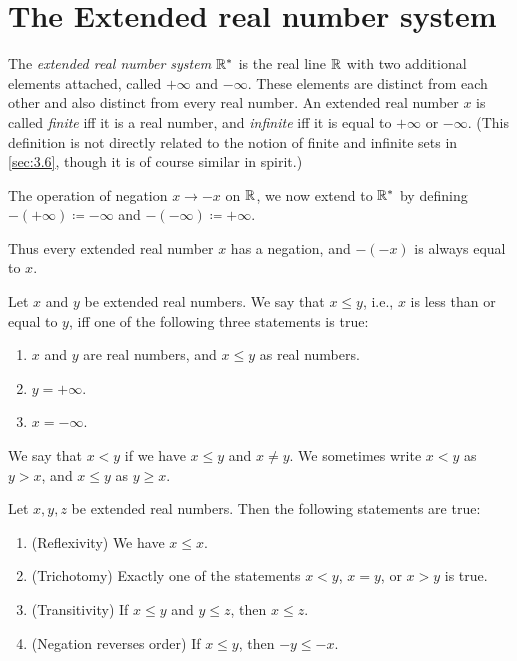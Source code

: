 \section{The Extended real number system}\label{sec:6.2}

\begin{defn}\label{6.2.1}
  The \emph{extended real number system \(\mathbb{R}^*\)} is the real line \(\mathbb{R}\) with two additional elements attached, called \(+\infty\) and \(-\infty\).
  These elements are distinct from each other and also distinct from every real number.
  An extended real number \(x\) is called \emph{finite} iff it is a real number, and \emph{infinite} iff it is equal to \(+\infty\) or \(-\infty\).
  (This definition is not directly related to the notion of finite and infinite sets in \cref{sec:3.6}, though it is of course similar in spirit.)
\end{defn}

\begin{defn}\label{6.2.2}
  The operation of negation \(x \to -x\) on \(\mathbb{R}\), we now extend to \(\mathbb{R}^*\) by defining \(-(+\infty) \coloneqq -\infty\) and \(-(-\infty) \coloneqq +\infty\).
\end{defn}

\begin{note}
  Thus every extended real number \(x\) has a negation, and \(-(-x)\) is always equal to \(x\).
\end{note}

\begin{defn}\label{6.2.3}
  Let \(x\) and \(y\) be extended real numbers.
  We say that \(x \leq y\), i.e., \(x\) is less than or equal to \(y\), iff one of the following three statements is true:
  \begin{enumerate}
    \item \(x\) and \(y\) are real numbers, and \(x \leq y\) as real numbers.
    \item \(y = +\infty\).
    \item \(x = -\infty\).
  \end{enumerate}
  We say that \(x < y\) if we have \(x \leq y\) and \(x \neq y\).
  We sometimes write \(x < y\) as \(y > x\), and \(x \leq y\) as \(y \geq x\).
\end{defn}

\setcounter{thm}{4}
\begin{prop}\label{6.2.5}
  Let \(x, y, z\) be extended real numbers.
  Then the following statements are true:
  \begin{enumerate}
    \item (Reflexivity)
          We have \(x \leq x\).
    \item (Trichotomy)
          Exactly one of the statements \(x < y\), \(x = y\), or \(x > y\) is true.
    \item (Transitivity)
          If \(x \leq y\) and \(y \leq z\), then \(x \leq z\).
    \item (Negation reverses order) If \(x \leq y\), then \(-y \leq -x\).
  \end{enumerate}
\end{prop}

